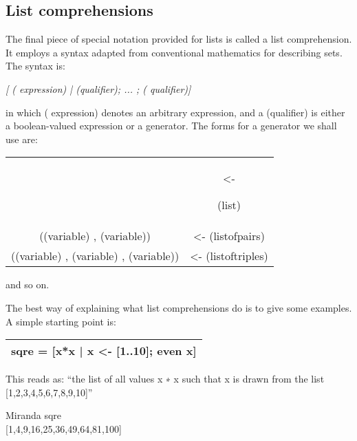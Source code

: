 \documentclass[11pt]{article}
\begin{document}
\subsection{List comprehensions}


The final piece of special notation provided for lists is called a list comprehension. It employs a syntax adapted from conventional mathematics for
describing sets. The syntax is: 

\begin{center}
    
    \textit{ [ ( expression) | (qualifier); ... ; ( qualifier)] }
    
    
\end{center}

in which ( expression) denotes an arbitrary expression, and a (qualifier) is
either a boolean-valued expression or a generator. The forms for a generator
we shall use are: 

\begin{center}
    
\begin{tabular}{c c}
\begin{flushrleft} (variable)\end{flushleft} & <- \begin{flushleft} (list)\end{flushleft}\\
((variable) , (variable))& <- (listofpairs)\\
((variable) , (variable) , (variable))& <- (listoftriples)\\
    \end{tabular}
    
\end{center}
and so on. 

The best way of explaining what list comprehensions do is to give some
examples. A simple starting point is:\\

\begin{center}
\begin{tabular}{|c|}
\hline
sqre = [x*x | x <- [1..10]; even x]\\
\hline
\end{tabular}
\end{center}

This reads as:
“the list of all values x ∗ x
such that x is drawn from the list [1,2,3,4,5,6,7,8,9,10]”

\begin{tcolorbox}
Miranda sqre\\
{[1,4,9,16,25,36,49,64,81,100]}

\end{tcolorbox}
\end{document}
